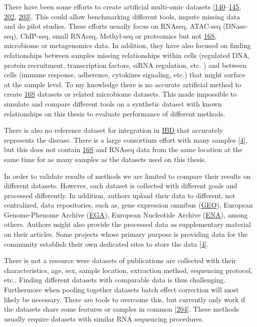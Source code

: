 \documentclass[
  12pt,
  a4paper,
  twoside,
  openright]{book}
\begin{document}
There have been some efforts to create artificial multi-omic datasets {[}\protect\hyperlink{ref-martuxednez-mira2018}{140}--\protect\hyperlink{ref-mccarthy2012}{145}, \protect\hyperlink{ref-chalise2016}{202}, \protect\hyperlink{ref-chung2019}{203}{]}.
This could allow benchmarking different tools, impute missing data and do pilot studies.
These efforts usually focus on RNAseq, ATAC-seq (DNase-seq), ChIP-seq, small RNAseq, Methyl-seq or proteomics but not \protect\hyperlink{acronyms_16S}{16S}, microbiome or metagenomics data.
In addition, they have also focused on finding relationships between samples missing relationships within cells (regulated DNA, protein recruitment, transcription factors, siRNA regulation, etc. ) and between cells (immune response, adherence, cytokines signaling, etc.) that might surface at the sample level.
To my knowledge there is no accurate artificial method to create \protect\hyperlink{acronyms_16S}{16S} datasets or related microbiome datasets.
This made impossible to simulate and compare different tools on a synthetic dataset with known relationships on this thesis to evaluate performance of different methods.

There is also no reference dataset for integration in \protect\hyperlink{acronyms_IBD}{IBD} that accurately represents the disease.
There is a large consortium effort with many samples {[}\protect\hyperlink{ref-humanmicrobiomeprojectconsortium2012}{4}{]}, but this does not contain \protect\hyperlink{acronyms_16S}{16S} and RNAseq data from the same location at the same time for as many samples as the datasets used on this thesis.

In order to validate results of methods we are limited to compare their results on different datasets.
However, each dataset is collected with different goals and processed differently.
In addition, authors upload their data to different, not centralized, data repositories, such as, gene expression omnibus (\href{https://www.ncbi.nlm.nih.gov/geo/}{GEO}), European Genome-Phenome Archive (\href{https://ega-archive.org/}{EGA}), European Nucleotide Archive (\href{https://www.ebi.ac.uk/ena/browser/home}{ENA}), among others.
Authors might also provide the processed data as supplementary material on their articles.
Some projects whose primary purpose is providing data for the community establish their own dedicated sites to store the data {[}\protect\hyperlink{ref-humanmicrobiomeprojectconsortium2012}{4}{]}.

There is not a resource were datasets of publications are collected with their characteristics, age, sex, sample location, extraction method, sequencing protocol, etc..
Finding different datasets with comparable data is thus challenging.
Furthermore when pooling together datasets batch effect correction will most likely be necessary.
There are tools to overcome this, but currently only work if the datasets share some features or samples in common {[}\protect\hyperlink{ref-ugidos2020}{204}{]}.
These methods usually require datasets with similar RNA sequencing procedures.
\end{document}
